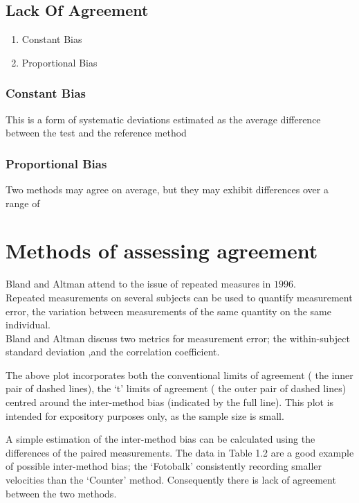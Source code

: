 \documentclass[Main.tex]{subfiles}
\begin{document}
\subsection{Lack Of Agreement}
\begin{enumerate}
	\item Constant Bias\item Proportional Bias
\end{enumerate}

\subsubsection*{Constant Bias} This is a form of systematic
deviations estimated as the average difference between the test
and the reference method


\subsubsection*{Proportional Bias} Two methods may agree on
average, but they may exhibit differences over a range of
	\section{Methods of assessing agreement}
	

	
	Bland and Altman attend to the issue of repeated measures in
	$1996$.
	\\
	Repeated measurements on several subjects can be used to quantify
	measurement error, the variation between measurements of the same
	quantity on the same individual.
	\\
	Bland and Altman discuss two metrics for measurement error; the
	within-subject standard deviation ,and the correlation
	coefficient.
	
	The above plot incorporates both the conventional limits of
	agreement ( the inner pair of dashed lines), the `t' limits of
	agreement ( the outer pair of dashed lines) centred around the
	inter-method bias (indicated by the full line). This plot is
	intended for expository purposes only, as the sample size is
	small.
	
	

	
	A simple estimation of the inter-method bias can be calculated
	using the differences of the paired measurements. The data in
	Table 1.2 are a good example of possible inter-method bias; the
	`Fotobalk' consistently recording smaller velocities than the
	`Counter' method. Consequently there is lack of agreement between
	the two methods.






\end{document}

